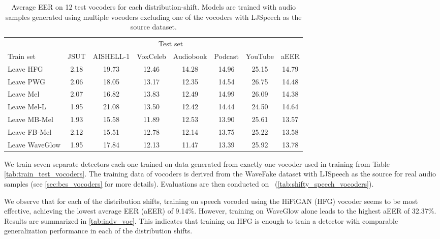 \begin{table*}[htb!]
    \caption{Average EER on 12 test vocoders for each distribution-shift. Models are trained with audio samples generated using multiple vocoders excluding one of the vocoders with LJSpeech as the source dataset.}
    \label{tab:leave-one-out}
     \vskip 0.15in
\begin{center}
\begin{small}
\begin{sc}
    \begin{tabular}{lccccccc}
    \toprule
      & \multicolumn{6}{c}{Test set} \\
      \cmidrule(lr){2-8}
Train set & JSUT & AISHELL-1  &VoxCeleb & Audiobook & Podcast & YouTube & aEER\\ 
    \midrule
       Leave HFG &2.18 & 19.73&12.46 &14.28 &14.96 &25.15 & 14.79\\ 
       \hline
       Leave PWG &2.06 & 18.05&13.17&12.35 &14.54&26.75 & 14.48\\ 
       \hline
       Leave Mel &2.07&16.82 &13.83 &12.49 &14.99&26.09 & 14.38\\ 
       \hline
       Leave Mel-L &1.95 &21.08 &13.50 &12.42 &14.44 & 24.50 & 14.64\\ 
       \hline
       Leave MB-Mel &1.93 &15.58 &11.89 &12.53 &13.90& 25.61 & 13.57\\ 
       \hline
        Leave FB-Mel &2.12 &15.51 &12.78 &12.14 &13.75 & 25.22 & 13.58 \\ 
        \hline
         Leave WaveGlow &1.95 &17.84 &12.13&11.47&13.39 &25.92 & 
        13.78\\ 
         \bottomrule 
    \end{tabular}
    \end{sc}
\end{small}
\end{center}
\vskip -0.1in
\end{table*}

We train seven separate detectors each one trained on data generated from exactly one vocoder used in training from Table \ref{tab:train_test_vocoders}. The training data of vocoders is derived from the WaveFake \cite{frank2021wavefakedatasetfacilitate} dataset with LJSpeech as the source for real audio samples (see \autoref{sec:bes_vocoders} for more details). Evaluations are then conducted on \methodName \ (\autoref{tab:shifty_speech_vocoders}).

We observe that for each of the distribution shifts, training on speech vocoded using the HiFiGAN (HFG) vocoder seems to be most effective, achieving the lowest average EER (aEER) of 9.14\%. However, training on WaveGlow alone leads to the highest aEER of 32.37\%. Results are summarized in \autoref{tab:indv_voc}. This indicates that training on HFG is enough to train a detector with comparable generalization performance in each of the distribution shifts. 

